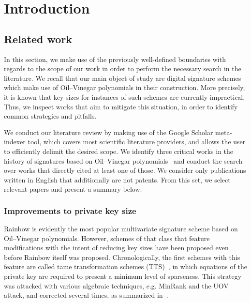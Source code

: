 \documentclass[draft, 12pt, a4paper, oneside]{memoir}
\theoremstyle{definition}
\theoremstyle{remark}
\begin{document}
\chapter{Introduction}\label{chapter:intro}


\section{Related work}\label{sec:related}

In this section, we make use of the previously well-defined boundaries with regards to the scope of our work in order to perform the necessary search in the literature. We recall that our main object of study are digital signature schemes which make use of Oil--Vinegar polynomials in their construction. More precisely, it is known that key sizes for instances of such schemes are currently impractical. Thus, we inspect works that aim to mitigate this situation, in order to identify common strategies and pitfalls.

We conduct our literature review by making use of the Google Scholar meta-indexer tool, which covers most scientific literature providers, and allows the user to efficiently delimit the desired scope. We identify three critical works in the history of signatures based on Oil--Vinegar polynomials~\cite{Patarin:199709,Kipnis:199904,Ding:200506} and conduct the search over works that directly cited at least one of those. We consider only publications written in English that additionally are not patents. From this set, we select relevant papers and present a summary below.

\subsection{Improvements to private key size}\label{subsec:priv}

Rainbow is evidently the most popular multivariate signature scheme based on Oil--Vinegar polynomials. However, schemes of that class that feature modifications with the intent of reducing key sizes have been proposed even before Rainbow itself was proposed. Chronologically, the first schemes with this feature are called tame transformation schemes (TTS)~\cite{Chen:200210}, in which equations of the private key are required to present a minimum level of sparseness. This strategy was attacked with various algebraic techniques, e.g. MinRank and the UOV attack, and corrected several times, as summarized in~\cite{Ding:200604}.
\end{document}
